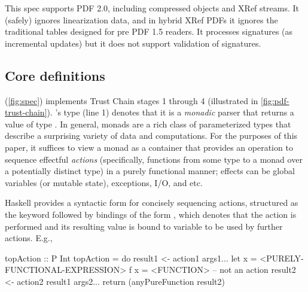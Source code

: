 This spec supports PDF 2.0, including compressed objects and XRef streams.
%
It (safely) ignores linearization data, and in hybrid XRef PDFs
it ignores the traditional \xref{} tables designed for pre PDF 1.5 readers.
It processes signatures (as incremental updates) but it does not support
validation of signatures.

\subsection{Core definitions}
\label{sec:core}
\iffalse
\begin{code}
{-# LANGUAGE EmptyDataDecls, TypeOperators, LambdaCase #-}
module Spec where
import           Control.Monad
import           Data.Char
import           Data.Foldable(foldlM)
import qualified Data.IntSet as IntSet
import           Data.List
import qualified Data.Map as M
import           Data.Map(Map)
import           Types
import           Utils
import           Primitives
import           Streams
\end{code}
\fi

 (\cref{fig:spec}) implements Trust Chain stages 1 through 4 (illustrated in \cref{fig:pdf-trust-chain}).
% 
's type (line 1) denotes that it
is a \emph{monadic} parser  that returns a value of type
.
%
In general, monads are a rich class of parameterized types that
describe a surprising variety of data and computations.
%
For the purposes of this paper, it suffices to view a monad as a container that provides an operation to sequence effectful \emph{actions} (specifically, functions from some type to a monad over a potentially distinct type) in a purely functional manner;
%
effects can be global variables (or mutable state), exceptions, I/O, and etc.

Haskell provides a syntactic form for concisely sequencing actions, structured as the keyword  followed by bindings of the form , which denotes that the action  is performed and its resulting value is bound to variable  to be used by further actions.
%
E.g.,
\begin{codeNoExecute}
  topAction :: P Int
  topAction = do
              result1 <- action1 args1...
              let x = <PURELY-FUNCTIONAL-EXPRESSION>
                  f x = <FUNCTION> -- not an action
              result2 <- action2 result1 args2...
              return (anyPureFunction result2)
\end{codeNoExecute}
%

